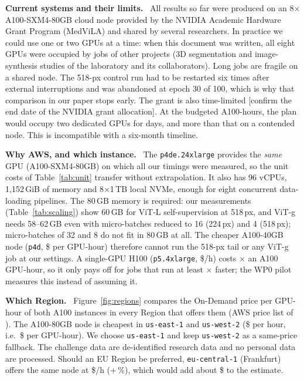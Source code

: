 \documentclass[11pt,a4paper]{article}
\newcommand{\para}[1]{\textbf{#1}\ }
\newcommand{\confirm}[1]{\textcolor{red!70!black}{[#1]}}
\begin{document}
\para{Current systems and their limits.} All results so far were produced on an 8$\times$ A100-SXM4-80GB cloud node provided by the NVIDIA Academic Hardware Grant Program (MedViLA) and shared by several researchers. In practice we could use one or two GPUs at a time: when this document was written, all eight GPUs were occupied by jobs of other projects (3D segmentation and image-synthesis studies of the laboratory and its collaborators). Long jobs are fragile on a shared node. The 518-px control run had to be restarted six times after external interruptions and was abandoned at epoch 30 of 100, which is why that comparison in our paper stops early. The grant is also time-limited \confirm{confirm the end date of the NVIDIA grant allocation}. At the budgeted \GPUhBudget{} A100-hours, the plan would occupy two dedicated GPUs for \TwoGPUDays{} days, and more than that on a contended node. This is incompatible with a six-month timeline.

\para{Why AWS, and which instance.} The \texttt{p4de.24xlarge} provides the \emph{same} GPU (A100-SXM4-80GB) on which all our timings were measured, so the unit costs of Table~\ref{tab:unit} transfer without extrapolation. It also has 96 vCPUs, 1,152\,GiB of memory and 8$\times$1\,TB local NVMe, enough for eight concurrent data-loading pipelines. The 80\,GB memory is required: our measurements (Table~\ref{tab:scaling}) show 60\,GB for ViT-L self-supervision at 518\,px, and ViT-g needs 58--62\,GB even with micro-batches reduced to 16 (224\,px) and 4 (518\,px); micro-batches of 32 and 8 do not fit in 80\,GB at all. The cheaper A100-40GB node (\texttt{p4d}, \$\PfourdGPUUSDh{} per GPU-hour) therefore cannot run the 518-px tail or any ViT-g job at our settings. A single-GPU H100 (\texttt{p5.4xlarge}, \$\PfiveUSDh/h) costs \HBreakEven$\times$ an A100 GPU-hour, so it only pays off for jobs that run at least \HBreakEven$\times$ faster; the WP0 pilot measures this instead of assuming it.

\para{Which Region.} Figure~\ref{fig:regions} compares the On-Demand price per GPU-hour of both A100 instances in every Region that offers them (AWS price list of \PriceDate). The A100-80GB node is cheapest in \texttt{us-east-1} and \texttt{us-west-2} (\$\NodeUSDh{} per hour, i.e.\ \$\GPUUSDh{} per GPU-hour). We choose \texttt{us-east-1} and keep \texttt{us-west-2} as a same-price fallback. The challenge data are de-identified research data and no personal data are processed. Should an EU Region be preferred, \texttt{eu-central-1} (Frankfurt) offers the same node at \$\EUNodeUSDh/h (+\EUPremiumPct\,\%), which would add about \$\EUExtraUSD{} to the estimate.
\end{document}
